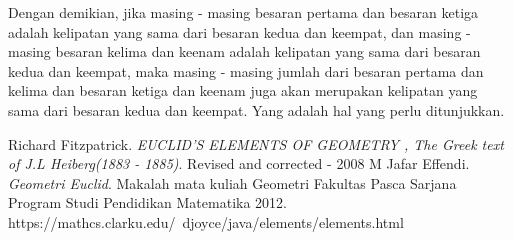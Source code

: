 \documentclass[a4paper]{book}
\begin{document}
Dengan demikian, jika masing - masing besaran pertama dan besaran ketiga adalah 
kelipatan yang sama dari besaran kedua dan keempat, dan masing - masing besaran
kelima dan keenam adalah kelipatan yang sama dari besaran kedua dan keempat, maka
masing - masing jumlah dari besaran pertama dan kelima dan besaran ketiga dan 
keenam juga akan merupakan kelipatan yang sama dari besaran kedua dan keempat. Yang
adalah hal yang perlu ditunjukkan.


\begin{thebibliography}{9} 
Richard Fitzpatrick.
\textit{EUCLID’S ELEMENTS OF GEOMETRY , The Greek text of J.L Heiberg(1883 - 1885)}.
Revised and corrected - 2008 
M Jafar Effendi.
\textit{Geometri Euclid}.
Makalah mata kuliah Geometri Fakultas Pasca Sarjana Program Studi Pendidikan Matematika 2012.
https://mathcs.clarku.edu/~djoyce/java/elements/elements.html 
\end{thebibliography}
\end{document}
